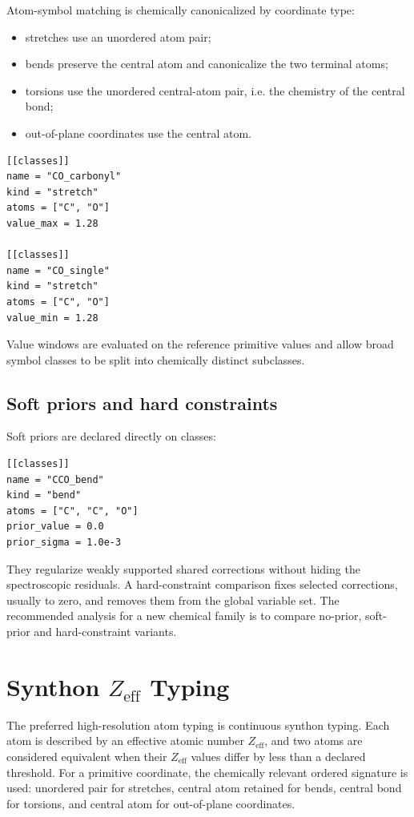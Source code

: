 \documentclass[11pt]{article}
\newcommand{\zeff}{Z_\mathrm{eff}}
\begin{document}
Atom-symbol matching is chemically canonicalized by coordinate type:

\begin{itemize}
  \item stretches use an unordered atom pair;
  \item bends preserve the central atom and canonicalize the two terminal atoms;
  \item torsions use the unordered central-atom pair, i.e. the chemistry of the
        central bond;
  \item out-of-plane coordinates use the central atom.
\end{itemize}

\begin{lstlisting}[style=oracle]
[[classes]]
name = "CO_carbonyl"
kind = "stretch"
atoms = ["C", "O"]
value_max = 1.28

[[classes]]
name = "CO_single"
kind = "stretch"
atoms = ["C", "O"]
value_min = 1.28
\end{lstlisting}

\noindent
Value windows are evaluated on the reference primitive values and allow broad
symbol classes to be split into chemically distinct subclasses.

\subsection{Soft priors and hard constraints}

Soft priors are declared directly on classes:

\begin{lstlisting}[style=oracle]
[[classes]]
name = "CCO_bend"
kind = "bend"
atoms = ["C", "C", "O"]
prior_value = 0.0
prior_sigma = 1.0e-3
\end{lstlisting}

\noindent
They regularize weakly supported shared corrections without hiding the
spectroscopic residuals.  A hard-constraint comparison fixes selected
corrections, usually to zero, and removes them from the global variable set.
The recommended analysis for a new chemical family is to compare no-prior,
soft-prior and hard-constraint variants.

\section{Synthon \texorpdfstring{\(Z_\mathrm{eff}\)}{Zeff} Typing}

The preferred high-resolution atom typing is continuous synthon typing.  Each
atom is described by an effective atomic number \(\zeff\), and two atoms are
considered equivalent when their \(\zeff\) values differ by less than a
declared threshold.  For a primitive coordinate, the chemically relevant
ordered signature is used: unordered pair for stretches, central atom retained
for bends, central bond for torsions, and central atom for out-of-plane
coordinates.
\end{document}
